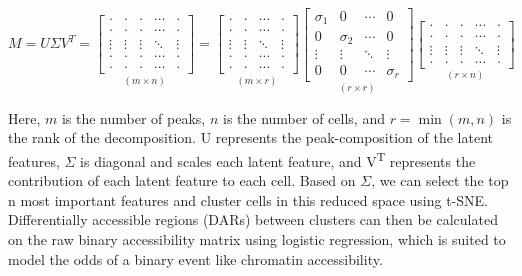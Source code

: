 \[
	M = U\Sigma V^T =
	\underset{(m \times n)}{\begin{bmatrix}
			\cdot  & \cdot  & \cdot  & \cdots & \cdot  \\
			\cdot  & \cdot  & \cdot  & \cdots & \cdot  \\
			\vdots & \vdots & \vdots & \ddots & \vdots \\
			\cdot  & \cdot  & \cdot  & \cdots & \cdot  \\
			\cdot  & \cdot  & \cdot  & \cdots & \cdot
		\end{bmatrix}}
	=
	\underset{(m \times r)}{\begin{bmatrix}
			\cdot  & \cdot  & \cdots & \cdot  \\
			\cdot  & \cdot  & \cdots & \cdot  \\
			\vdots & \vdots & \ddots & \vdots \\
			\cdot  & \cdot  & \cdots & \cdot  \\
			\cdot  & \cdot  & \cdots & \cdot
		\end{bmatrix}}
	\underset{(r \times r)}{\begin{bmatrix}
			\sigma_1 & 0        & \cdots & 0        \\
			0        & \sigma_2 & \cdots & 0        \\
			\vdots   & \vdots   & \ddots & \vdots   \\
			0        & 0        & \cdots & \sigma_r
		\end{bmatrix}}
	\underset{(r \times n)}{\begin{bmatrix}
			\cdot  & \cdot  & \cdot  & \cdots & \cdot  \\
			\cdot  & \cdot  & \cdot  & \cdots & \cdot  \\
			\vdots & \vdots & \vdots & \ddots & \vdots \\
			\cdot  & \cdot  & \cdot  & \cdots & \cdot
		\end{bmatrix}}
\]

Here, $m$ is the number of peaks, $n$ is the number of cells, and $r = \min(m,n)$ is the rank of the decomposition. U represents the peak-composition of the latent features, $\Sigma$ is diagonal and scales each latent feature, and V\textsuperscript{T} represents the contribution of each latent feature to each cell. Based on $\Sigma$, we can select the top n most important features and cluster cells in this reduced space using t-SNE. Differentially accessible regions (DARs) between clusters can then be calculated on the raw binary accessibility matrix using logistic regression, which is suited to model the odds of a binary event like chromatin accessibility.

